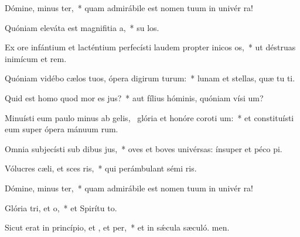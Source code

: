 \item Dómine, minus ter,~* quam admirábile est nomen tuum in univér ra!
\item Quóniam eleváta est magnifitia a,~* su los.
\item Ex ore infántium et lacténtium perfecísti laudem propter inicos os,~* ut déstruas inimícum et rem.
\item Quóniam vidébo cælos tuos, ópera digirum turum:~* lunam et stellas, quæ tu ti.
\item Quid est homo quod mor es jus?~* aut fílius hóminis, quóniam vísi um?
\item Minuísti eum paulo minus ab gelis,~\pscross{} glória et honóre coroti um:~* et constituísti eum super ópera mánuum rum.
\item Omnia subjecísti sub dibus jus,~* oves et boves univérsas: ínsuper et péco pi.
\item Vólucres cæli, et sces ris,~* qui perámbulant sémi ris.
\item Dómine, minus ter,~* quam admirábile est nomen tuum in univér ra!
\item Glória tri, et o,~* et Spirítu to.
\item Sicut erat in princípio, et , et per,~* et in sǽcula sæculó. men.
